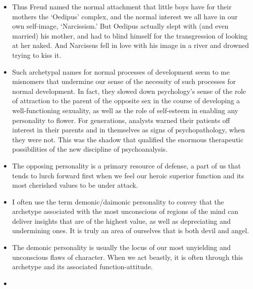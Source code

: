 \begin{itemize}
When there is development of both the superior and the inferior functions, we
can speak of a ‘spine’ of consciousness that gives a personality backbone.

\item

Thus Freud named the normal attachment that little boys have for their mothers
the ‘Oedipus’ complex, and the normal interest we all have in our own
self-image, ‘Narcissism.’ But Oedipus actually slept with (and even married)
his mother, and had to blind himself for the transgression of looking at her
naked. And Narcissus fell in love with his image in a river and drowned trying
to kiss it.

\item

Such archetypal names for normal processes of development seem to me misnomers
that undermine our sense of the necessity of such processes for normal
development. In fact, they slowed down psychology’s sense of the role of
attraction to the parent of the opposite sex in the course of developing a
well-functioning sexuality, as well as the role of self-esteem in enabling any
personality to flower. For generations, analysts warned their patients off
interest in their parents and in themselves as signs of psychopathology, when
they were not. This was the shadow that qualified the enormous therapeutic
possibilities of the new discipline of psychoanalysis.

\item

The opposing personality is a primary resource of defense, a part of us that
tends to lurch forward first when we feel our heroic superior function and its
most cherished values to be under attack.

\item

I often use the term demonic/daimonic personality to convey that the archetype
associated with the most unconscious of regions of the mind can deliver
insights that are of the highest value, as well as depreciating and undermining
ones. It is truly an area of ourselves that is both devil and angel.

\item

The demonic personality is usually the locus of our most unyielding and
unconscious flaws of character. When we act beastly, it is often through this
archetype and its associated function-attitude.

\item


\end{itemize}
